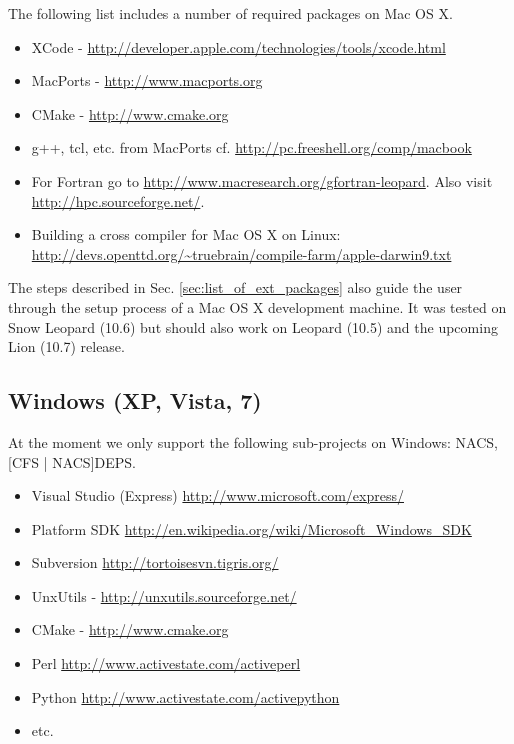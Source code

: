 The following list includes a number of required packages on Mac OS X. 
\begin{itemize}
\item XCode - \url{http://developer.apple.com/technologies/tools/xcode.html}
\item MacPorts - \url{http://www.macports.org}
\item CMake - \url{http://www.cmake.org}
\item g++, tcl,  etc. from MacPorts 
cf. \url{http://pc.freeshell.org/comp/macbook}
\item For Fortran go to \url{http://www.macresearch.org/gfortran-leopard}. Also
visit \url{http://hpc.sourceforge.net/}.
\item Building a cross compiler for Mac OS X on Linux: \url{http://devs.openttd.org/~truebrain/compile-farm/apple-darwin9.txt}
\end{itemize} 

The  steps described  in Sec.   \ref{sec:list_of_ext_packages} also  guide the
user through  the setup  process of a  Mac OS  X development machine.   It was
tested on Snow  Leopard (10.6) but should also work on  Leopard (10.5) and the
upcoming Lion (10.7) release.

\subsection{Windows (XP, Vista, 7)}

At the  moment we  only support the  following sub-projects on  Windows: NACS,
[CFS | NACS]DEPS.

\begin{itemize}
\item Visual Studio (Express) \url{http://www.microsoft.com/express/}
\item Platform SDK \url{http://en.wikipedia.org/wiki/Microsoft_Windows_SDK}
\item Subversion \url{http://tortoisesvn.tigris.org/}
\item UnxUtils - \url{http://unxutils.sourceforge.net/}
\item CMake - \url{http://www.cmake.org}
\item Perl \url{http://www.activestate.com/activeperl}
\item Python \url{http://www.activestate.com/activepython}
\item etc.
\end{itemize} 

